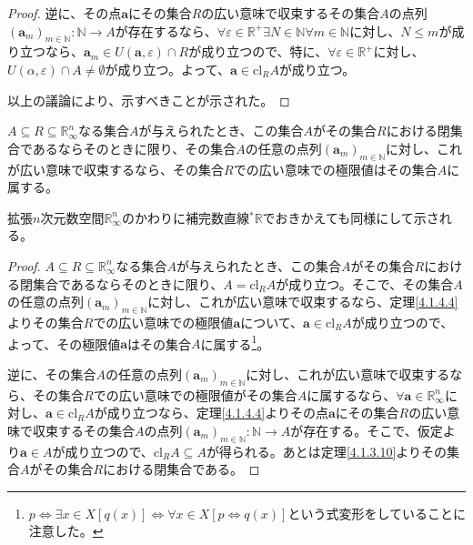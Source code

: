 \documentclass[dvipdfmx]{jsarticle}
\begin{document}
\begin{proof}
逆に、その点$\mathbf{a}$にその集合$R$の広い意味で収束するその集合$A$の点列$\left( \mathbf{a}_{m} \right)_{m \in \mathbb{N}}:\mathbb{N} \rightarrow A$が存在するなら、$\forall\varepsilon \in \mathbb{R}^{+}\exists N \in \mathbb{N}\forall m \in \mathbb{N}$に対し、$N \leq m$が成り立つなら、$\mathbf{a}_{m} \in U\left( \mathbf{a},\varepsilon \right) \cap R$が成り立つので、特に、$\forall\varepsilon \in \mathbb{R}^{+}$に対し、$U(\alpha,\varepsilon) \cap A \neq \emptyset$が成り立つ。よって、$\mathbf{a} \in \mathrm{cl}_{R}A$が成り立つ。\par
以上の議論により、示すべきことが示された。
\end{proof}
\begin{thm}\label{4.1.4.5}
$A \subseteq R \subseteq \mathbb{R}_{\infty}^{n}$なる集合$A$が与えられたとき、この集合$A$がその集合$R$における閉集合であるならそのときに限り、その集合$A$の任意の点列$\left( \mathbf{a}_{m} \right)_{m \in \mathbb{N}}$に対し、これが広い意味で収束するなら、その集合$R$での広い意味での極限値はその集合$A$に属する。\par
拡張$n$次元数空間$\mathbb{R}_{\infty}^{n}$のかわりに補完数直線${}^{*}\mathbb{R}$でおきかえても同様にして示される。
\end{thm}
\begin{proof}
$A \subseteq R \subseteq \mathbb{R}_{\infty}^{n}$なる集合$A$が与えられたとき、この集合$A$がその集合$R$における閉集合であるならそのときに限り、$A = \mathrm{cl}_{R}A$が成り立つ。そこで、その集合$A$の任意の点列$\left( \mathbf{a}_{m} \right)_{m \in \mathbb{N}}$に対し、これが広い意味で収束するなら、定理\ref{4.1.4.4}よりその集合$R$での広い意味での極限値$\mathbf{a}$について、$\mathbf{a} \in \mathrm{cl}_{R}A$が成り立つので、よって、その極限値$\mathbf{a}$はその集合$A$に属する\footnote{$p \Leftrightarrow \exists x \in X\left[ q(x) \right] \Leftrightarrow \forall x \in X\left[ p \Leftrightarrow q(x) \right]$という式変形をしていることに注意した。}。\par
逆に、その集合$A$の任意の点列$\left( \mathbf{a}_{m} \right)_{m \in \mathbb{N}}$に対し、これが広い意味で収束するなら、その集合$R$での広い意味での極限値がその集合$A$に属するなら、$\forall\mathbf{a} \in \mathbb{R}_{\infty}^{n}$に対し、$\mathbf{a} \in \mathrm{cl}_{R}A$が成り立つなら、定理\ref{4.1.4.4}よりその点$\mathbf{a}$にその集合$R$の広い意味で収束するその集合$A$の点列$\left( \mathbf{a}_{m} \right)_{m \in \mathbb{N}}:\mathbb{N} \rightarrow A$が存在する。そこで、仮定より$\mathbf{a} \in A$が成り立つので、$\mathrm{cl}_{R}A \subseteq A$が得られる。あとは定理\ref{4.1.3.10}よりその集合$A$がその集合$R$における閉集合である。
\end{proof}
\end{document}
